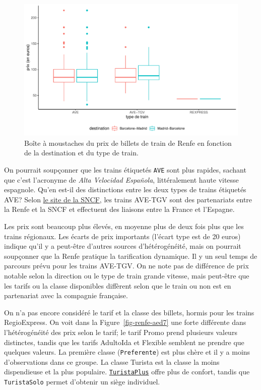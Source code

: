 \documentclass[
  11pt,
  letterpaper,
]{scrbook}
\theoremstyle{definition}
\theoremstyle{remark}
\begin{document}
\begin{figure}[ht!]

{\centering \includegraphics[width=1\textwidth,height=\textheight]{analyseexploratoire_files/figure-pdf/fig-renfe-aed4-1.pdf}

}

\caption{\label{fig-renfe-aed4}Boîte à moustaches du prix de billets de
train de Renfe en fonction de la destination et du type de train.}

\end{figure}

On pourrait soupçonner que les trains étiquetés \texttt{AVE} sont plus
rapides, sachant que c'est l'acronyme de \emph{Alta Velocidad Española},
littéralement haute vitesse espagnole. Qu'en est-il des distinctions
entre les deux types de trains étiquetés AVE? Selon
\href{https://www.renfe-sncf.com/rw-en/services/a-unique-experience/Pages/services.aspx}{le
site de la SNCF}, les trains AVE-TGV sont des partenariats entre la
Renfe et la SNCF et effectuent des liaisons entre la France et
l'Espagne.

Les prix sont beaucoup plus élevés, en moyenne plus de deux fois plus
que les trains régionaux. Les écarts de prix importants (l'écart type
est de 20 euros) indique qu'il y a peut-être d'autres sources
d'hétérogénéité, mais on pourrait soupçonner que la Renfe pratique la
tarification dynamique. Il y un seul temps de parcours prévu pour les
trains AVE-TGV. On ne note pas de différence de prix notable selon la
direction ou le type de train grande vitesse, mais peut-être que les
tarifs ou la classe disponibles diffèrent selon que le train ou non est
en partenariat avec la compagnie française.

On n'a pas encore considéré le tarif et la classe des billets, hormis
pour les trains RegioExpress. On voit dans la
Figure~\ref{fig-renfe-aed7} une forte différente dans l'hétérogénéité
des prix selon le tarif; le tarif Promo prend plusieurs valeurs
distinctes, tandis que les tarifs AdultoIda et Flexible semblent ne
prendre que quelques valeurs. La première classe (\texttt{Preferente})
est plus chère et il y a moins d'observations dans ce groupe. La classe
Turista est la classe la moins dispendieuse et la plus populaire.
\href{http://web.archive.org/web/20161111134241/http://www.renfe.com/viajeros/tarifas/billete_promo.html}{\texttt{TuristaPlus}}
offre plus de confort, tandis que \texttt{TuristaSolo} permet d'obtenir
un siège individuel.
\end{document}
